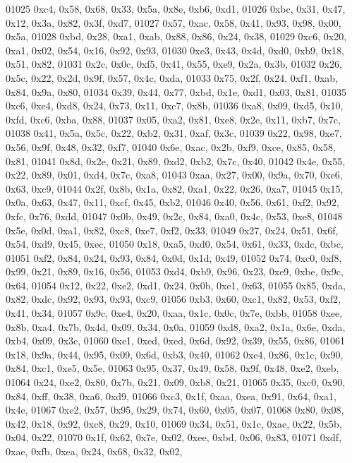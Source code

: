 \begin{DoxyCode}
01025   0xc4, 0x58, 0x68, 0x33, 0x5a, 0x8e, 0xb6, 0xd1,
01026   0xbc, 0x31, 0x47, 0x12, 0x3a, 0x82, 0x3f, 0xd7,
01027   0x57, 0xac, 0x58, 0x41, 0x93, 0x98, 0x00, 0x5a,
01028   0xbd, 0x28, 0xa1, 0xab, 0x88, 0x86, 0x24, 0x38,
01029   0xc6, 0x20, 0xa1, 0x02, 0x54, 0x16, 0x92, 0x93,
01030   0xe3, 0x43, 0x4d, 0xd0, 0xb9, 0x18, 0x51, 0x82,
01031   0x2c, 0x0c, 0xf5, 0x41, 0x55, 0xe9, 0x2a, 0x3b,
01032   0x26, 0x5c, 0x22, 0x2d, 0x9f, 0x57, 0x4c, 0xda,
01033   0x75, 0x2f, 0x24, 0xf1, 0xab, 0x84, 0x9a, 0x80,
01034   0x39, 0x44, 0x77, 0xbd, 0x1e, 0xd1, 0x03, 0x81,
01035   0xc6, 0xe4, 0xd8, 0x24, 0x73, 0x11, 0xc7, 0x8b,
01036   0xa8, 0x09, 0xd5, 0x10, 0xfd, 0xc6, 0xba, 0x88,
01037   0x05, 0xa2, 0x81, 0xe8, 0x2e, 0x11, 0xb7, 0x7c,
01038   0x41, 0x5a, 0x5c, 0x22, 0xb2, 0x31, 0xaf, 0x3c,
01039   0x22, 0x98, 0xe7, 0x56, 0x9f, 0x48, 0x32, 0xf7,
01040   0x6e, 0xac, 0x2b, 0xf9, 0xce, 0x85, 0x58, 0x81,
01041   0x8d, 0x2e, 0x21, 0x89, 0xd2, 0xb2, 0x7c, 0x40,
01042   0x4e, 0x55, 0x22, 0x89, 0x01, 0xd4, 0x7c, 0xa8,
01043   0xaa, 0x27, 0x00, 0x9a, 0x70, 0xe6, 0x63, 0xc9,
01044   0x2f, 0x8b, 0x1a, 0x82, 0xa1, 0x22, 0x26, 0xa7,
01045   0x15, 0x0a, 0x63, 0x47, 0x11, 0xcf, 0x45, 0xb2,
01046   0x40, 0x56, 0x61, 0xf2, 0x92, 0xfc, 0x76, 0xdd,
01047   0x0b, 0x49, 0x2c, 0x84, 0xa0, 0x4c, 0x53, 0xe8,
01048   0x5e, 0x0d, 0xa1, 0x82, 0xc8, 0xe7, 0xf2, 0x33,
01049   0x27, 0x24, 0x51, 0x6f, 0x54, 0xd9, 0x45, 0xec,
01050   0x18, 0xa5, 0xd0, 0x54, 0x61, 0x33, 0xdc, 0xbc,
01051   0xf2, 0x84, 0x24, 0x93, 0x84, 0x0d, 0x1d, 0x49,
01052   0x74, 0xc0, 0xf8, 0x99, 0x21, 0x89, 0x16, 0x56,
01053   0xd4, 0xb9, 0x96, 0x23, 0xe9, 0xbe, 0x9c, 0x64,
01054   0x12, 0x22, 0xe2, 0xd1, 0x24, 0x0b, 0xe1, 0x63,
01055   0x85, 0xda, 0x82, 0xdc, 0x92, 0x93, 0x93, 0xc9,
01056   0xb3, 0x60, 0xc1, 0x82, 0x53, 0xf2, 0x41, 0x34,
01057   0x9c, 0xe4, 0x20, 0xaa, 0x1c, 0x0c, 0x7e, 0xbb,
01058   0xee, 0x8b, 0xa4, 0x7b, 0x4d, 0x09, 0x34, 0x0a,
01059   0xd8, 0xa2, 0x1a, 0x6e, 0xda, 0xb4, 0x09, 0x3c,
01060   0xe1, 0xed, 0xed, 0x6d, 0x92, 0x39, 0x55, 0x86,
01061   0x18, 0x9a, 0x44, 0x95, 0x09, 0x6d, 0xb3, 0x40,
01062   0xe4, 0x86, 0x1c, 0x90, 0x84, 0xc1, 0xe5, 0x5e,
01063   0x95, 0x37, 0x49, 0x58, 0x9f, 0x48, 0xe2, 0xeb,
01064   0x24, 0xe2, 0x80, 0x7b, 0x21, 0x09, 0xb8, 0x21,
01065   0x35, 0xc0, 0x90, 0x84, 0xff, 0x38, 0xa6, 0xd9,
01066   0xc3, 0x1f, 0xaa, 0xea, 0x91, 0x64, 0xa1, 0x4e,
01067   0xe2, 0x57, 0x95, 0x29, 0x74, 0x60, 0x05, 0x07,
01068   0x80, 0x08, 0x42, 0x18, 0x92, 0xc8, 0x29, 0x10,
01069   0x34, 0x51, 0x1c, 0xae, 0x22, 0x5b, 0x04, 0x22,
01070   0x1f, 0x62, 0x7e, 0x02, 0xee, 0xbd, 0x06, 0x83,
01071   0xdf, 0xae, 0xfb, 0xea, 0x24, 0x68, 0x32, 0x02,

\end{DoxyCode}
